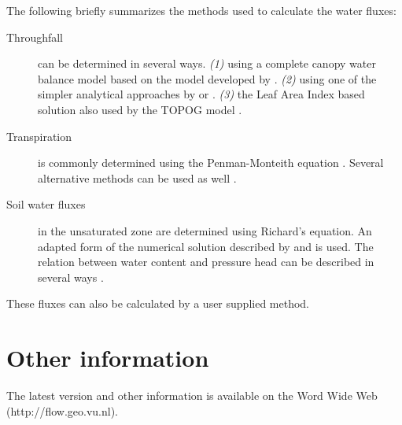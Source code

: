 \documentclass[11pt]{book}
\newcommand{\Index}[1]{#1\index{#1}}
\newcommand{\url}[1]{#1}
\begin{document}
The following briefly summarizes the methods used to
calculate the water fluxes:
\begin{description}
\item[Throughfall] can be determined in several ways. {\em (1)} using 
a complete canopy water balance model based on the model developed by
 . {\em (2)} using one of the simpler 
analytical approaches by   or
 .  {\em (3)} the Leaf Area Index based
solution also used by the TOPOG model \cite{vertessy1993140}.

\item[Transpiration] is commonly determined using the Penman-Monteith
equation \cite{monteith1965}. Several alternative methods can be used 
as well \cite{penman1956N,makkink1957,makkink1961,commissie1988N}.

\item[Soil water fluxes] in the unsaturated zone are determined using
Richard's equation. An adapted form of the numerical solution described
by    and   is used.
The relation between water content and pressure head can be
described in several ways 
\cite{genuchten1980179,mualem1976261,clapp1978263}.

\end{description}
These fluxes can also be calculated by a user supplied method.

\section*{Other information}

The latest version and other information is  available on the
\Index{Word Wide Web}
(\url{http://flow.geo.vu.nl}). 






\printindex
\end{document}
